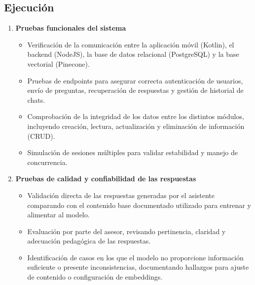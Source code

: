 \subsection{Ejecución}
\begin{enumerate}
      \item \textbf{Pruebas funcionales del sistema}
            \begin{itemize}
                  \item Verificación de la comunicación entre la aplicación móvil (Kotlin), el backend
                        (NodeJS), la base de datos relacional (PostgreSQL) y la base vectorial
                        (Pinecone).
                  \item Pruebas de endpoints para asegurar correcta autenticación de usuarios, envío de
                        preguntas, recuperación de respuestas y gestión de historial de chats.
                  \item Comprobación de la integridad de los datos entre los distintos módulos,
                        incluyendo creación, lectura, actualización y eliminación de información
                        (CRUD).
                  \item Simulación de sesiones múltiples para validar estabilidad y manejo de
                        concurrencia.
            \end{itemize}

      \item \textbf{Pruebas de calidad y confiabilidad de las respuestas}
            \begin{itemize}
                  \item Validación directa de las respuestas generadas por el asistente comparando con
                        el contenido base documentado utilizado para entrenar y alimentar al modelo.
                  \item Evaluación por parte del asesor, revisando pertinencia, claridad y adecuación
                        pedagógica de las respuestas.
                  \item Identificación de casos en los que el modelo no proporcione información
                        suficiente o presente inconsistencias, documentando hallazgos para ajuste de
                        contenido o configuración de embeddings.
            \end{itemize}


\end{enumerate}
